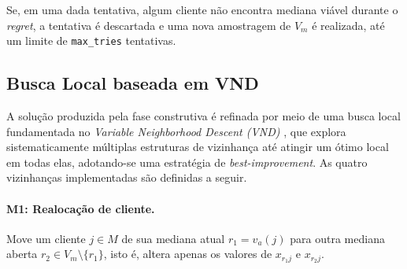 \documentclass[a4paper,11pt]{article}
\begin{document}
Se, em uma dada tentativa, algum cliente não encontra mediana viável durante o \textit{regret}, a tentativa é descartada e uma nova amostragem de $V_m$ é realizada, até um limite de \texttt{max\_tries} tentativas. 




\subsection{Busca Local baseada em VND}
\label{subsec:vnd}

A solução produzida pela fase construtiva é refinada por meio de uma busca local fundamentada no \textit{Variable Neighborhood Descent (VND)} \citep{mladenovic1997variable, freitas2025ils_pmediana}, que explora sistematicamente múltiplas estruturas de vizinhança até atingir um ótimo local em todas elas, adotando-se uma estratégia de \textit{best-improvement}. As quatro vizinhanças implementadas  são definidas a seguir.

\paragraph{M1: Realocação de cliente.} Move um cliente $j \in M$ de sua mediana atual $r_1 = v_a(j)$ para outra mediana aberta $r_2 \in V_m \setminus \{r_1\}$, isto é, altera apenas os valores de $x_{r_1 j}$ e $x_{r_2 j}$. 
\end{document}
